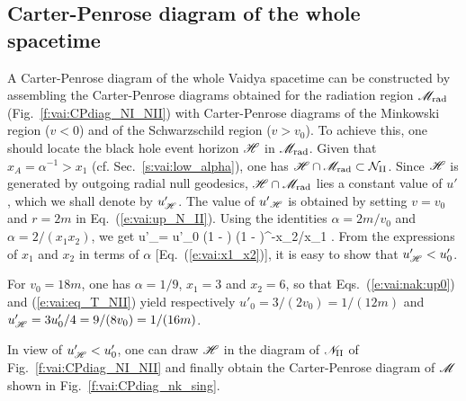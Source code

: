 \subsection{Carter-Penrose diagram of the whole spacetime}

A Carter-Penrose diagram of the whole Vaidya spacetime can be constructed
by assembling the Carter-Penrose diagrams obtained for the radiation region
$\mathscr{M}_{\rm rad}$ (Fig.~\ref{f:vai:CPdiag_NI_NII}) with Carter-Penrose diagrams of the Minkowski
region ($v<0$) and of the Schwarzschild region ($v> v_0$).
To achieve this, one should locate the black hole event horizon $\mathscr{H}$
in $\mathscr{M}_{\rm rad}$.
Given that $x_A = \alpha^{-1} >  x_1$ (cf. Sec.~\ref{s:vai:low_alpha}),
one has $\mathscr{H}\cap \mathscr{M}_{\rm rad} \subset
\mathcal{N}_{\rm II}$.
Since $\mathscr{H}$ is generated by outgoing radial
null geodesics, $\mathscr{H}\cap \mathscr{M}_{\rm rad}$ lies a constant value of $u'$, which
we shall denote by $u'_{\mathscr{H}}$. The value of ${u'}_{\mathscr{H}}$ is obtained by
setting $v=v_0$ and $r=2m$ in Eq.~(\ref{e:vai:up_N_II}). Using the identities
$\alpha = 2m/v_0$ and $\alpha = 2/(x_1 x_2)$, we get
\be \label{e:vai:nak:upH}
    u'_\Hor = u'_0 \left(1 -  \right)
    \left(1 -  \right)^{-x_2/x_1} .
\ee
From the expressions of $x_1$ and $x_2$ in terms of $\alpha$
[Eq.~(\ref{e:vai:x1_x2})], it is easy to show that $u'_{\mathscr{H}} < u'_0$.

\begin{example}
For $v_0 = 18 m$, one has $\alpha = 1/9$, $x_1 = 3$ and $x_2 = 6$, so that Eqs.~(\ref{e:vai:nak:up0})
and (\ref{e:vai:eq_T_NII}) yield respectively
$u'_0 = 3/(2 v_0) = 1/(12 m)$ and
$u'_{\mathscr{H}} = 3 u'_0 / 4=  9/(8 v_0) = 1/(16 m)$.
\end{example}

In view of $u'_{\mathscr{H}} < u'_0$, one can draw $\mathscr{H}$ in the diagram of $\mathscr{N}_{\rm II}$
of Fig.~\ref{f:vai:CPdiag_NI_NII} and finally obtain
the Carter-Penrose diagram of $\mathscr{M}$ shown in
Fig.~\ref{f:vai:CPdiag_nk_sing}.

